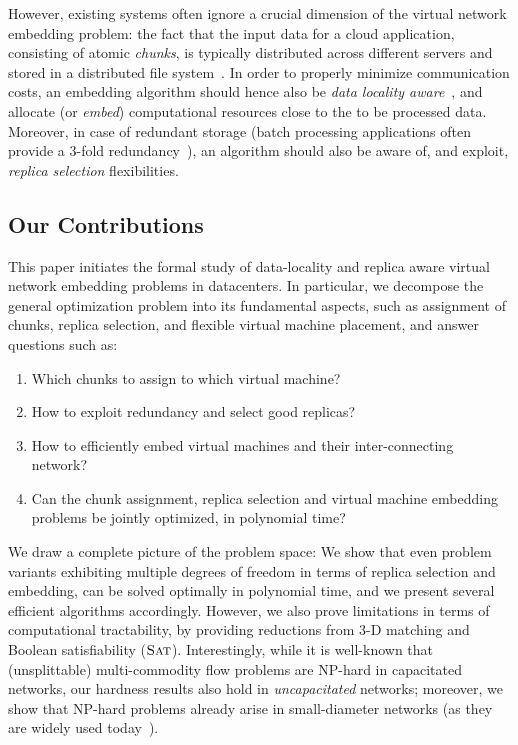\documentclass[preprint,12pt]{elsarticle}
\newcommand{\SAT}{\textsc{Sat}}
\begin{document}
However, existing systems often ignore a crucial dimension of the virtual network embedding problem:
the fact that the input data for a cloud application, consisting of atomic
\emph{chunks}, is typically distributed across different servers and stored in
a distributed file system~\cite{scope,google-fs,hdfs}.
In order to properly minimize
communication costs, an embedding algorithm should hence also be \emph{data locality aware}~\cite{local-schedule-1,local-schedule-2,local-schedule-3},
and allocate (or \emph{embed}) computational resources close to the to be processed data.
Moreover, in case of redundant storage (batch processing
applications often provide a 3-fold redundancy~\cite{hdfs}), an algorithm should also be aware of, and exploit, \emph{replica selection}
flexibilities.

\subsection{Our Contributions}

This paper initiates the formal study of data-locality and replica aware virtual network embedding problems in datacenters.
In particular, we decompose the general optimization problem into its fundamental aspects, such as
assignment of chunks, replica selection, and flexible virtual machine
placement, and answer questions such as:
\begin{enumerate}
\item Which chunks to assign to which virtual machine?

\item How to exploit redundancy and select good replicas?

\item How to efficiently embed virtual machines and their inter-connecting network?

\item Can the chunk assignment, replica selection and virtual machine embedding problems be jointly optimized, in polynomial time?
\end{enumerate}

We draw a complete picture of the problem space: We show that
even problem variants exhibiting multiple degrees of freedom in terms of
replica selection and embedding,
can be solved optimally in polynomial time, and we present several efficient
algorithms accordingly. However, we also prove limitations in terms of
computational tractability, by providing reductions from 3-D matching
and Boolean satisfiability ($\SAT$). Interestingly,
while it is well-known that (unsplittable) multi-commodity flow
problems are NP-hard in capacitated networks, our hardness results also hold in \emph{uncapacitated}
networks; moreover, we show that NP-hard problems already arise in small-diameter networks (as they are
widely used today~\cite{fattree}).
\end{document}
